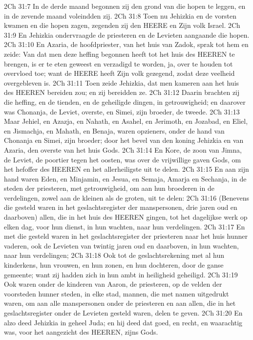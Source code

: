 2Ch 31:7  In de derde maand begonnen zij den grond van die hopen te leggen, en in de zevende maand voleindden zij.
2Ch 31:8  Toen nu Jehizkia en de vorsten kwamen en die hopen zagen, zegenden zij den HEERE en Zijn volk Israel.
2Ch 31:9  En Jehizkia ondervraagde de priesteren en de Levieten aangaande die hopen.
2Ch 31:10  En Azaria, de hoofdpriester, van het huis van Zadok, sprak tot hem en zeide: Van dat men deze heffing begonnen heeft tot het huis des HEEREN te brengen, is er te eten geweest en verzadigd te worden, ja, over te houden tot overvloed toe; want de HEERE heeft Zijn volk gezegend, zodat deze veelheid overgebleven is.
2Ch 31:11  Toen zeide Jehizkia, dat men kameren aan het huis des HEEREN bereiden zou; en zij bereidden ze.
2Ch 31:12  Daarin brachten zij die heffing, en de tienden, en de geheiligde dingen, in getrouwigheid; en daarover was Chonanja, de Leviet, overste, en Simei, zijn broeder, de tweede.
2Ch 31:13  Maar Jehiel, en Azazja, en Nahath, en Asahel, en Jerimoth, en Jozabad, en Eliel, en Jismachja, en Mahath, en Benaja, waren opzieners, onder de hand van Chonanja en Simei, zijn broeder; door het bevel van den koning Jehizkia en van Azaria, den overste van het huis Gods.
2Ch 31:14  En Kore, de zoon van Jimna, de Leviet, de poortier tegen het oosten, was over de vrijwillige gaven Gods, om het hefoffer des HEEREN en het allerheiligste uit te delen.
2Ch 31:15  En aan zijn hand waren Eden, en Minjamin, en Jesua, en Semaja, Amarja en Sechanja, in de steden der priesteren, met getrouwigheid, om aan hun broederen in de verdelingen, zowel aan de kleinen als de groten, uit te delen:
2Ch 31:16  (Benevens die gesteld waren in het geslachtsregister der manspersonen, drie jaren oud en daarboven) allen, die in het huis des HEEREN gingen, tot het dagelijkse werk op elken dag, voor hun dienst, in hun wachten, naar hun verdelingen.
2Ch 31:17  En met die gesteld waren in het geslachtsregister der priesteren naar het huis hunner vaderen, ook de Levieten van twintig jaren oud en daarboven, in hun wachten, naar hun verdelingen;
2Ch 31:18  Ook tot de geslachtsrekening met al hun kinderkens, hun vrouwen, en hun zonen, en hun dochteren, door de ganse gemeente; want zij hadden zich in hun ambt in heiligheid geheiligd.
2Ch 31:19  Ook waren onder de kinderen van Aaron, de priesteren, op de velden der voorsteden hunner steden, in elke stad, mannen, die met namen uitgedrukt waren, om aan alle manspersonen onder de priesteren en aan allen, die in het geslachtsregister onder de Levieten gesteld waren, delen te geven.
2Ch 31:20  En alzo deed Jehizkia in geheel Juda; en hij deed dat goed, en recht, en waarachtig was, voor het aangezicht des HEEREN, zijns Gods.
